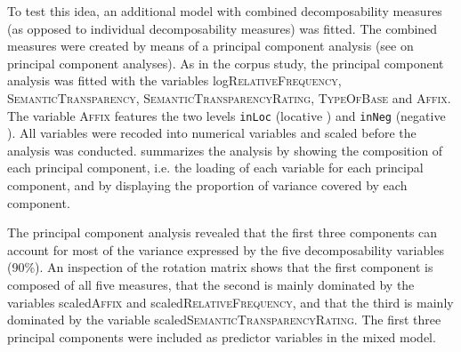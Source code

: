 To test this idea, an additional model with combined decomposability measures (as opposed to individual decomposability measures) was fitted. The combined measures were created by means of a principal component analysis (see  on principal component analyses). 
As in the corpus study, the principal component analysis was fitted with the variables log\textsc{RelativeFrequency}, \textsc{SemanticTransparency}, \textsc{SemanticTransparencyRating}, \textsc{TypeOfBase} and \textsc{Affix}. The variable \textsc{Affix} features the two levels \texttt{inLoc} (locative ) and \texttt{inNeg} (negative ). All variables were recoded into numerical variables and scaled before the analysis was conducted. 
 summarizes the analysis by showing the composition of each principal component, i.e. the loading of each variable for each principal component, and by displaying the proportion of variance covered by each component. 










The principal component analysis revealed that the first three components can account for most of the variance expressed by the five decomposability variables (90\%). An inspection of the rotation matrix shows that the first component is composed of all five measures, that the second is mainly dominated by the variables scaled\textsc{Affix} and scaled\textsc{RelativeFrequency}, and that the third is mainly dominated by the variable scaled\textsc{SemanticTransparencyRating}. 
The first three principal components were included as predictor variables in the mixed model.  




